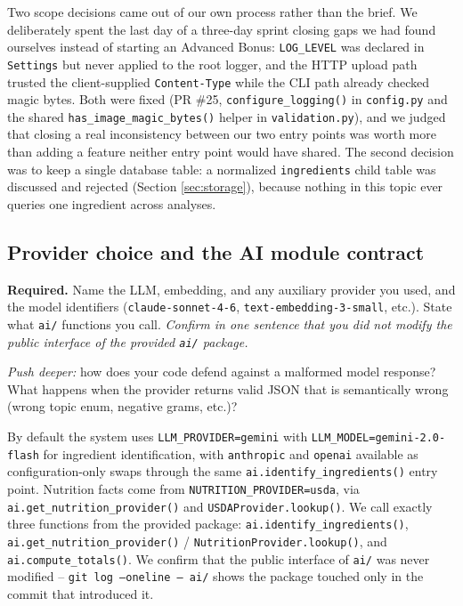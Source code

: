 \documentclass[11pt,a4paper]{article}
\newenvironment{deliverbox}{\begin{deliverboxshown}}{\end{deliverboxshown}}
\newenvironment{probebox}{\begin{probeboxshown}}{\end{probeboxshown}}
\newenvironment{deliverbox}{\setbox0\vbox\bgroup}{\egroup\ignorespacesafterend}
\newenvironment{probebox}{\setbox0\vbox\bgroup}{\egroup\ignorespacesafterend}
\begin{document}
\par\noindent
Two scope decisions came out of our own process rather than the brief. We
deliberately spent the last day of a three-day sprint closing gaps we had
found ourselves instead of starting an Advanced Bonus: \texttt{LOG\_LEVEL}
was declared in \texttt{Settings} but never applied to the root logger, and
the HTTP upload path trusted the client-supplied \texttt{Content-Type}
while the CLI path already checked magic bytes. Both were fixed (PR \#25,
\texttt{configure\_logging()} in \texttt{config.py} and the shared
\texttt{has\_image\_magic\_bytes()} helper in \texttt{validation.py}), and
we judged that closing a real inconsistency between our two entry points
was worth more than adding a feature neither entry point would have shared.
The second decision was to keep a single database table: a normalized
\texttt{ingredients} child table was discussed and rejected (Section
\ref{sec:storage}), because nothing in this topic ever queries one
ingredient across analyses.

\subsection{Provider choice and the AI module contract}

\begin{deliverbox}
\textbf{Required.} Name the LLM, embedding, and any auxiliary provider you used, and the model identifiers (\texttt{claude-sonnet-4-6}, \texttt{text-embedding-3-small}, etc.). State what \texttt{ai/} functions you call. \emph{Confirm in one sentence that you did not modify the public interface of the provided \texttt{ai/} package.}
\end{deliverbox}

\begin{probebox}
\textit{Push deeper:} how does your code defend against a malformed model response? What happens when the provider returns valid JSON that is semantically wrong (wrong topic enum, negative grams, etc.)?
\end{probebox}

\par\noindent
By default the system uses \texttt{LLM\_PROVIDER=gemini} with
\texttt{LLM\_MODEL=gemini-2.0-flash} for ingredient identification, with
\texttt{anthropic} and \texttt{openai} available as configuration-only
swaps through the same \texttt{ai.identify\_ingredients()} entry point.
Nutrition facts come from \texttt{NUTRITION\_PROVIDER=usda}, via
\texttt{ai.get\_nutrition\_provider()} and \texttt{USDAProvider.lookup()}.
We call exactly three functions from the provided package:
\texttt{ai.identify\_ingredients()}, \texttt{ai.get\_nutrition\_provider()}
/ \texttt{NutritionProvider.lookup()}, and \texttt{ai.compute\_totals()}. We
confirm that the public interface of \texttt{ai/} was never modified --
\texttt{git log --oneline -- ai/} shows the package touched only in the
commit that introduced it.
\end{document}
